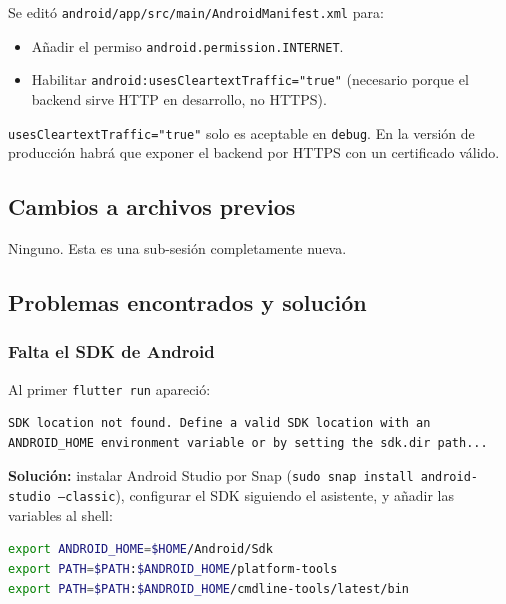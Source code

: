 Se editó \texttt{android/app/src/main/AndroidManifest.xml} para:

\begin{itemize}[leftmargin=*]
  \item Añadir el permiso \texttt{android.permission.INTERNET}.
  \item Habilitar \texttt{android:usesCleartextTraffic="true"} (necesario porque el backend sirve HTTP en desarrollo, no HTTPS).
\end{itemize}

\begin{aviso}[Advertencia]
\texttt{usesCleartextTraffic="true"} solo es aceptable en \texttt{debug}. En la versión de producción habrá que exponer el backend por HTTPS con un certificado válido.
\end{aviso}

\subsection{Cambios a archivos previos}

Ninguno. Esta es una sub-sesión completamente nueva.

\subsection{Problemas encontrados y solución}

\subsubsection{Falta el SDK de Android}

Al primer \texttt{flutter run} apareció:

\begin{lstlisting}[language=bash]
SDK location not found. Define a valid SDK location with an
ANDROID_HOME environment variable or by setting the sdk.dir path...
\end{lstlisting}

\textbf{Solución:} instalar Android Studio por Snap (\texttt{sudo snap install android-studio --classic}), configurar el SDK siguiendo el asistente, y añadir las variables al shell:

\begin{lstlisting}[language=bash]
export ANDROID_HOME=$HOME/Android/Sdk
export PATH=$PATH:$ANDROID_HOME/platform-tools
export PATH=$PATH:$ANDROID_HOME/cmdline-tools/latest/bin
\end{lstlisting}

